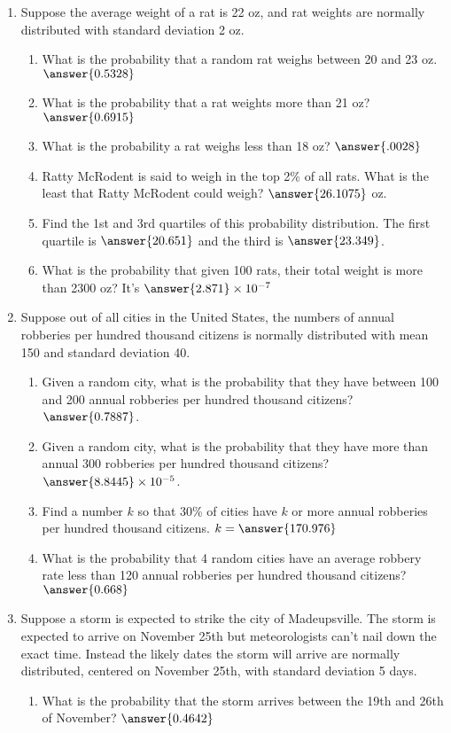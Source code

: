 \documentclass{ximera}
\begin{document}
\begin{enumerate}
\item Suppose the average weight of a rat is 22 oz, and rat weights are normally distributed with standard deviation 2 oz.
\begin{enumerate}
\item What is the probability that a random rat weighs between 20 and 23 oz.  $\answer{0.5328}$
\item What is the probability that a rat weights more than 21 oz? $\answer{0.6915}$
\item What is the probability a rat weighs less than 18 oz? $\answer{.0028}$
\item Ratty McRodent is said to weigh in the top 2\% of all rats.  What is the least that Ratty McRodent could weigh? $\answer{26.1075}$ oz.
\item Find the 1st and 3rd quartiles of this probability distribution.  The first quartile is $\answer{20.651}$ and the third is $\answer{23.349}$.
\item What is the probability that given 100 rats, their total weight is more than 2300 oz? It's $\answer{2.871}\times 10^{-7}$
\end{enumerate}
\item Suppose out of all cities in the United States, the numbers of annual robberies per hundred thousand citizens is normally distributed with mean 150  and standard deviation 40.
\begin{enumerate}
\item Given a random city, what is the probability that they have between 100 and 200 annual robberies per hundred thousand citizens? $\answer{0.7887}$.
\item Given a random city, what is the probability that they have more than annual 300 robberies per hundred thousand citizens? $\answer{8.8445}\times 10^{-5}$.
\item Find a number $k$ so that 30\% of cities have $k$ or more annual robberies per hundred thousand citizens. $k=\answer{170.976}$
\item What is the probability that 4 random cities have an average robbery rate less than 120 annual robberies per hundred thousand citizens? $\answer{0.668}$
\end{enumerate}
\item Suppose a storm is expected to strike the city of Madeupsville.  The storm is expected to arrive on November 25th but meteorologists can't nail down the exact time.  Instead the likely dates the storm will arrive are normally distributed, centered on November 25th, with standard deviation 5 days.
\begin{enumerate}
\item What is the probability that the storm arrives between the 19th and 26th of November? $\answer{0.4642}$


\end{enumerate}
\end{enumerate}
\end{document}
